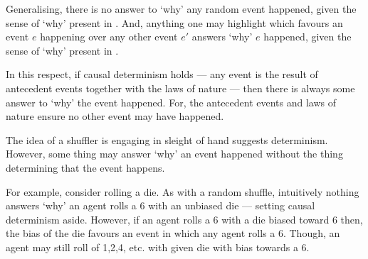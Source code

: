 \begin{note}
  \nocite{Hoefer:2023aa}
  Generalising, there is no answer to `why' any random event happened, given the sense of `why' present in \qWhy{}.
  And, anything one may highlight which favours an event \(e\) happening over any other event \(e'\) answers `why' \(e\) happened, given the sense of `why' present in \qWhy{}.

  In this respect, if causal determinism holds --- any event is the result of antecedent events together with the laws of nature --- then there is always some answer to `why' the event happened.
  For, the antecedent events and laws of nature ensure no other event may have happened.
\end{note}


\begin{note}
  The idea of a shuffler is engaging in sleight of hand suggests determinism.
  However, some thing may answer `why' an event happened without the thing determining that the event happens.

  For example, consider rolling a die.
  As with a random shuffle, intuitively nothing answers `why' an agent rolls a 6 with an unbiased die  --- setting causal determinism aside.
  However, if an agent rolls a 6 with a die biased toward 6 then, the bias of the die favours an event in which any agent rolls a 6.
  Though, an agent may still roll of 1,2,4, etc. with given die with bias towards a 6.
\end{note}


